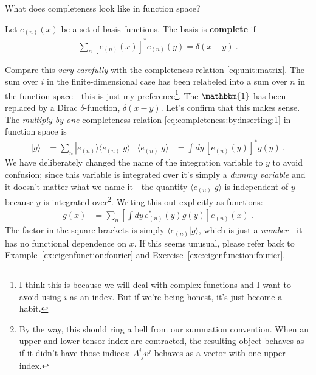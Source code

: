 \documentclass[
  11pt,
	colorful,
	raggedright,
]{tufte-style-thesis-flip}
\newcommand{\aij}[2]{^{#1}_{\phantom{#1}#2}}
\newcommand{\mat}[3]{#1\aij{#2}{#3}}
\begin{document}
What does completeness look like in function space?
\begin{framed}\noindent
Let $e_{(n)}(x)$ be a set of basis functions. The basis is \textbf{complete} if
\begin{align}
  \sum_n \left[e_{(n)}(x)\right]^* e_{(n)}(y) = \delta(x-y) \ .
  \label{eq:function:space:completeness}
\end{align}
\end{framed}
Compare this \emph{very carefully} with the completeness relation \eqref{eq:unit:matrix}. The sum over $i$ in the finite-dimensional case has been relabeled into a sum over $n$ in the function space---this is just my preference\footnote{I think this is because we will deal with complex functions and I want to avoid using $i$ as an index. But if we're being honest, it's just become a habit.}. The $\mathbbm{1}$ has been replaced by a Dirac $\delta$-function, $\delta(x-y)$. Let's confirm that this makes sense. The \emph{multiply by one} completeness relation \eqref{eq:completeness:by:inserting:1} in function space is
\begin{align}
  |g\rangle 
  &= 
  \sum_n |e_{(n)}\rangle\langle e_{(n)}| g\rangle
  &
  \langle e_{(n)}| g\rangle &=
  \int dy \, [e_{(n)}(y)]^* g(y) \ .
\end{align}
We have deliberately changed the name of the integration variable to $y$ to avoid confusion; since this variable is integrated over it's simply a \emph{dummy variable} and it doesn't matter what we name it---the quantity $\langle e_{(n)}|g\rangle$ is independent of $y$ because $y$ is integrated over\footnote{By the way, this should ring a bell from our summation convention. When an upper and lower tensor index are contracted, the resulting object behaves as if it didn't have those indices: $\mat{A}{i}{j}v^j$ behaves as a vector with one upper index.}. Writing this out explicitly as functions:
\begin{align}
  g(x) &= \sum_n\left[\int dy\, e_{(n)}^*(y)g(y)\right] e_{(n)}(x) \ .
  \label{eq:complenesss:function:space:in:action }
\end{align}
The factor in the square brackets is simply $\langle e_{(n)}| g\rangle$, which is just a \emph{number}---it has no functional dependence on $x$.
If this seems unusual, please refer back to Example~\ref{ex:eigenfunction:fourier} and Exercise~\ref{exe:eigenfunction:fourier}. 
\end{document}
